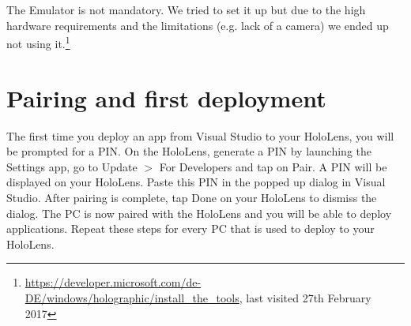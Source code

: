 The Emulator is not mandatory. We tried to set it up but due to the high hardware requirements and the limitations (e.g. lack of a camera) we ended up not using it.\footnote[3]{\url{https://developer.microsoft.com/de-DE/windows/holographic/install_the_tools}, last visited 27th February 2017}

\section{Pairing and first deployment}
The first time you deploy an app from Visual Studio to your HoloLens, you will be prompted for a PIN. On the HoloLens, generate a PIN by launching the Settings app, go to Update $>$ For Developers and tap on Pair. A PIN will be displayed on your HoloLens. Paste this PIN in the popped up dialog in Visual Studio. After pairing is complete, tap Done on your HoloLens to dismiss the dialog. The PC is now paired with the HoloLens and you will be able to deploy applications. Repeat these steps for every PC that is used to deploy to your HoloLens.

